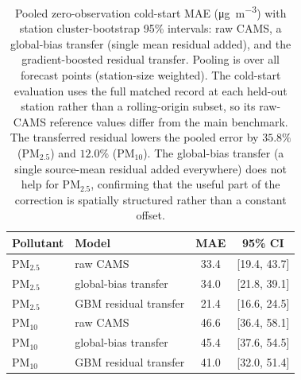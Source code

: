 \documentclass[11pt]{article}
\begin{document}
\begin{table}[htbp]\centering\footnotesize
\caption{Pooled zero-observation cold-start MAE (\si{\micro\gram\per\cubic\metre}) with station cluster-bootstrap 95\% intervals: raw CAMS, a global-bias transfer (single mean residual added), and the gradient-boosted residual transfer. Pooling is over all forecast points (station-size weighted). The cold-start evaluation uses the full matched record at each held-out station rather than a rolling-origin subset, so its raw-CAMS reference values differ from the main benchmark. The transferred residual lowers the pooled error by $35.8\%$ (PM$_{2.5}$) and $12.0\%$ (PM$_{10}$). The global-bias transfer (a single source-mean residual added everywhere) does not help for PM$_{2.5}$, confirming that the useful part of the correction is spatially structured rather than a constant offset.}
\label{si:t10}
\begin{tabular}{llcc}\toprule
Pollutant & Model & MAE & 95\% CI \\ \midrule
PM$_{2.5}$ & raw CAMS & 33.4 & [19.4, 43.7] \\
PM$_{2.5}$ & global-bias transfer & 34.0 & [21.8, 39.1] \\
PM$_{2.5}$ & GBM residual transfer & 21.4 & [16.6, 24.5] \\
PM$_{10}$ & raw CAMS & 46.6 & [36.4, 58.1] \\
PM$_{10}$ & global-bias transfer & 45.4 & [37.6, 54.5] \\
PM$_{10}$ & GBM residual transfer & 41.0 & [32.0, 51.4] \\
\bottomrule\end{tabular}\end{table}
\end{document}
